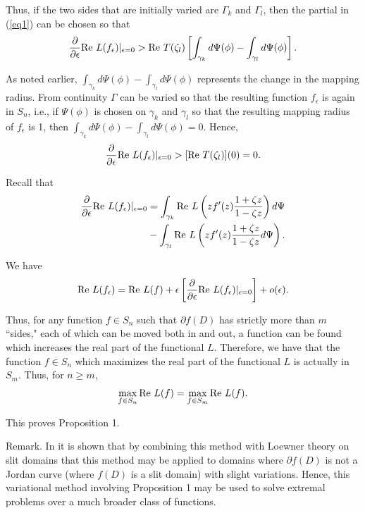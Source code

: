 \documentclass[final]{siamltex}
\begin{document}
\noindent Thus, if the two sides that are initially varied are $\Gamma_k$ and $\Gamma_l$, then the partial in (\ref{eq1}) can
be chosen so that 
$$\frac{\partial}{\partial \epsilon} {\rm Re} \  L(f_\epsilon)|_{\epsilon=0} > {\rm Re} \  T(\zeta_l)
\left [ \int_{\gamma_k} d\Psi(\phi) - \int_{\gamma_l} d\Psi(\phi) \right ].$$

As noted earlier, $\int_{\gamma_k} d\Psi(\phi) - \int_{\gamma_l} d\Psi(\phi)$ represents the change in the mapping radius.  From
continuity $\Gamma$ can be varied so that the resulting function $f_\epsilon$ is again in $S_n$, i.e., if $\Psi(\phi)$ is chosen on 
$\gamma_k$ and $\gamma_l$ so that the resulting mapping radius of $f_\epsilon$ is 1, then $\int_{\gamma_k} d\Psi(\phi) - \int_{\gamma_l} d\Psi(\phi) = 0$.
Hence, 
$$\frac{\partial}{\partial \epsilon} {\rm Re} \  L(f_\epsilon)|_{\epsilon=0} > [{\rm Re} \  T(\zeta_l)](0) = 0.$$

Recall that
\begin{align*}
\frac{\partial}{\partial \epsilon}  {\rm Re} \  L(f_\epsilon)|_{\epsilon=0}  &= \int_{\gamma_k} {\rm Re} \  L \left ( z f'(z) \frac{1+\zeta z}{1 - \zeta z} \right ) d\Psi \\
&- \int_{\gamma_l} {\rm Re} \  L \left ( z f'(z) \frac{1+\zeta z}{1 - \zeta z} d\Psi \right ).
\end{align*}

\noindent We have
$${\rm Re} \  L(f_\epsilon) = {\rm Re} \  L(f) + \epsilon \left [ \frac{\partial}{\partial \epsilon} 
{\rm Re} \  L(f_\epsilon)|_{\epsilon=0} \right ] + o(\epsilon).$$

\noindent Thus, for any function $f \in S_n$ such that $\partial f(D)$ has strictly more than $m$ ``sides,"
each of which can be moved both in and out, a function can be found which increases the real part of the functional $L$.
Therefore, we have that the function $f \in S_n$ which maximizes the real part of the functional $L$ is actually in $S_m$.
Thus, for $n \geq m$, 
$$\max \limits_{f \in S_n} {\rm Re} \  L(f) = \max \limits_{f \in S_m} {\rm Re} \  L(f).$$

This proves Proposition 1.

\vspace{0.1in}

Remark.  In \cite{Barnard6} it is shown that by combining this method with Loewner theory on slit domains 
that this method may be applied to domains where $\partial f(D)$ is not a Jordan curve (where $f(D)$ is a 
slit domain) with slight variations.  Hence, this variational method involving Proposition 1 may be used 
to solve extremal problems 
over a much broader class of functions.
\end{document}
